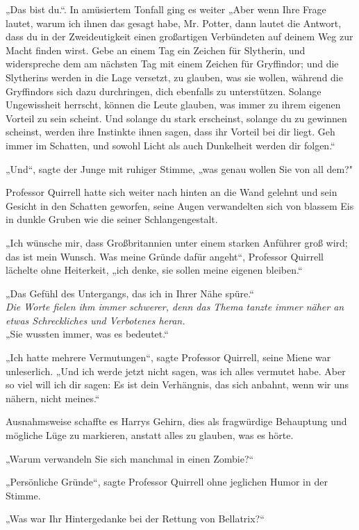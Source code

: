 {„Das bist du.“. In amüsiertem Tonfall ging es weiter „Aber wenn Ihre Frage lautet, warum ich ihnen das gesagt habe, Mr. Potter, dann lautet die Antwort, dass du in der Zweideutigkeit einen großartigen Verbündeten auf deinem Weg zur Macht finden wirst. Gebe an einem Tag ein Zeichen für Slytherin, und widerspreche dem am nächsten Tag mit einem Zeichen für Gryffindor; und die Slytherins werden in die Lage versetzt, zu glauben, was sie wollen, während die Gryffindors sich dazu durchringen, dich ebenfalls zu unterstützen. Solange Ungewissheit herrscht, können die Leute glauben, was immer zu ihrem eigenen Vorteil zu sein scheint. Und solange du stark erscheinst, solange du zu gewinnen scheinst, werden ihre Instinkte ihnen sagen, dass ihr Vorteil bei dir liegt. Geh immer im Schatten, und sowohl Licht als auch Dunkelheit werden dir folgen.“

„Und“, sagte der Junge mit ruhiger Stimme, „was genau wollen Sie von all dem?"

Professor Quirrell hatte sich weiter nach hinten an die Wand gelehnt und sein Gesicht in den Schatten geworfen, seine Augen verwandelten sich von blassem Eis in dunkle Gruben wie die seiner Schlangengestalt.

„Ich wünsche mir, dass Großbritannien unter einem starken Anführer groß wird; das ist mein Wunsch. Was meine Gründe dafür angeht“, Professor Quirrell lächelte ohne Heiterkeit, „ich denke, sie sollen meine eigenen bleiben.“

„Das Gefühl des Untergangs, das ich in Ihrer Nähe spüre.“\\ \emph{Die Worte fielen ihm immer schwerer, denn das Thema tanzte immer näher an etwas Schreckliches und Verbotenes heran.}\\ „Sie wussten immer, was es bedeutet.“

„Ich hatte mehrere Vermutungen“, sagte Professor Quirrell, seine Miene war unleserlich. „Und ich werde jetzt nicht sagen, was ich alles vermutet habe. Aber so viel will ich dir sagen: Es ist dein Verhängnis, das sich anbahnt, wenn wir uns nähern, nicht meines.“

Ausnahmsweise schaffte es Harrys Gehirn, dies als fragwürdige Behauptung und mögliche Lüge zu markieren, anstatt alles zu glauben, was es hörte.

„Warum verwandeln Sie sich manchmal in einen Zombie?“

„Persönliche Gründe“, sagte Professor Quirrell ohne jeglichen Humor in der Stimme.

„Was war Ihr Hintergedanke bei der Rettung von Bellatrix?“

}
